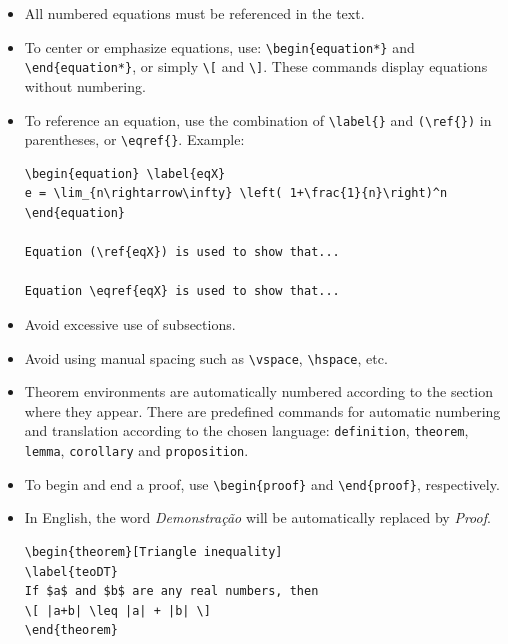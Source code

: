 \documentclass[english]{TCAM} %
\begin{document}
\begin{itemize}
\item All numbered equations must be referenced in the text.

\item To center or emphasize equations, use:
\verb|\begin{equation*}| and \verb|\end{equation*}|,
or simply \verb|\[| and \verb|\]|.
These commands display equations without numbering.

\item To reference an equation, use the combination of \verb|\label{}| and \verb|(\ref{})| in parentheses, or \verb|\eqref{}|. Example:

\begin{framed}
\begin{verbatim}
\begin{equation} \label{eqX}
e = \lim_{n\rightarrow\infty} \left( 1+\frac{1}{n}\right)^n
\end{equation}

Equation (\ref{eqX}) is used to show that...

Equation \eqref{eqX} is used to show that...
\end{verbatim}
\end{framed}

\item Avoid excessive use of subsections.

\item Avoid using manual spacing such as \verb|\vspace|, \verb|\hspace|, etc.

\item Theorem environments are automatically numbered according to the section where they appear. There are predefined commands for automatic numbering and translation according to the chosen language:
\texttt{definition}, \texttt{theorem}, \texttt{lemma}, \texttt{corollary} and \texttt{proposition}.

\item To begin and end a proof, use \verb|\begin{proof}| and \verb|\end{proof}|, respectively.

\item In English, the word \textit{Demonstração} will be automatically replaced by \textit{Proof}.

\newpage

\begin{framed}
\begin{verbatim}
\begin{theorem}[Triangle inequality]
\label{teoDT}
If $a$ and $b$ are any real numbers, then
\[ |a+b| \leq |a| + |b| \]
\end{theorem}


\end{verbatim}
\end{framed}
\end{itemize}
\end{document}
